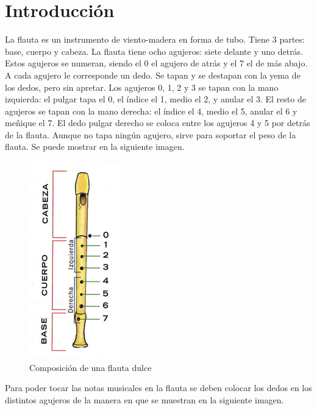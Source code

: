 \section{Introducción}
La flauta es un instrumento de viento-madera en forma de tubo. Tiene
3 partes: base, cuerpo y cabeza. La flauta tiene ocho agujeros: siete
delante y uno detrás. Estos agujeros se numeran, siendo el 0 el agujero
de atrás y el 7 el de más abajo. A cada agujero le corresponde un
dedo. Se tapan y se destapan con la yema de los dedos, pero sin apretar.
Los agujeros 0, 1, 2 y 3 se tapan con la mano izquierda: el pulgar
tapa el 0, el índice el 1, medio el 2, y anular el 3. El resto de
agujeros se tapan con la mano derecha: el índice el 4, medio el 5,
anular el 6 y meñique el 7. El dedo pulgar derecho se coloca entre
los agujeros 4 y 5 por detrás de la flauta. Aunque no tapa ningún
agujero, sirve para soportar el peso de la flauta. Se puede mostrar
en la siguiente imagen.
\begin{figure}[H]
	\begin{center}
		\includegraphics[scale=.8]{img/flauta.png}
		\caption{Composición de una flauta dulce}
		\label{fig:tabla0}
	\end{center}
\end{figure}
Para poder tocar las notas musicales en la flauta se deben colocar
los dedos en los distintos agujeros de la manera en que se muestran
en la siguiente imagen.
